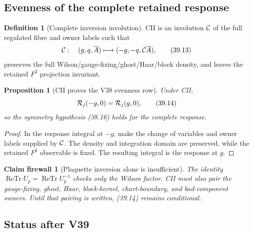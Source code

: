 \documentclass[11pt,oneside]{book}
\newtheorem{proposition}[theorem]{Proposition}
\newtheorem{firewall}[theorem]{Claim firewall}
\theoremstyle{definition}
\newtheorem{definition}[theorem]{Definition}
\theoremstyle{remark}
\begin{document}
\subsection{Evenness of the complete retained response}

\begin{definition}[Complete inversion involution]
\label{def:e8v39-involution}
CII is an involution \({\cal C}\) of the full regulated fibre and
owner labels such that
\[
 {\cal C}:\quad(g,q,\overline A)\longmapsto
 (-g,-q,{\cal C}\overline A),                                   \tag{39.13}
\]
preserves the full Wilson/gauge-fixing/ghost/Haar/block density,
and leaves the retained \(F^2\) projection invariant.
\end{definition}

\begin{proposition}[CII proves the V38 evenness row]
\label{prop:e8v39-evenness}
Under CII,
\[
                         {\cal R}_j(-g,0)={\cal R}_j(g,0),        \tag{39.14}
\]
so the symmetry hypothesis (38.16) holds for the complete response.
\end{proposition}

\begin{proof}
In the response integral at \(-g\), make the change of variables and
owner labels supplied by \({\cal C}\).  The density and integration
domain are preserved, while the retained \(F^2\) observable is fixed.
The resulting integral is the response at \(g\).
\end{proof}

\begin{firewall}[Plaquette inversion alone is insufficient]
\label{fire:e8v39-involution-complete}
The identity
\(\operatorname{ReTr}U_p=\operatorname{ReTr}U_p^{-1}\)
checks only the Wilson factor.  CII must also pair the gauge-fixing,
ghost, Haar, block-kernel, chart-boundary, and bad-component owners.
Until that pairing is written, (39.14) remains conditional.
\end{firewall}

\subsection{Status after V39}
\end{document}
